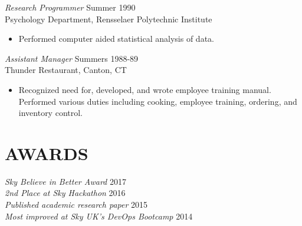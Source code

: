 \documentclass[margin]{res}
\begin{document}
\begin{resume}
                {\sl Research Programmer} \hfill            Summer 1990 \\
                Psychology Department, Rensselaer Polytechnic 
                Institute 
                 \begin{itemize}  \itemsep -2pt
                 \item Performed computer aided statistical analysis 
                    of data. 
                 \end{itemize} 
                {\sl Assistant Manager} \hfill        Summers 1988-89 \\
                Thunder Restaurant, Canton, CT
                  \begin{itemize}
                   \item Recognized need for, developed, and wrote 
                    employee training manual. Performed various 
                    duties including cooking, employee training, 
                    ordering, and inventory control. 
                   \end{itemize} 

\section{AWARDS}
	    {\sl Sky Believe in Better Award} \hfill 2017 \\
	    {\sl 2nd Place at Sky Hackathon} \hfill 2016 \\
	    {\sl Published academic research paper} \hfill 2015 \\
	    {\sl Most improved at Sky UK's DevOps Bootcamp} \hfill 2014 \\

\end{resume}
\end{document}
